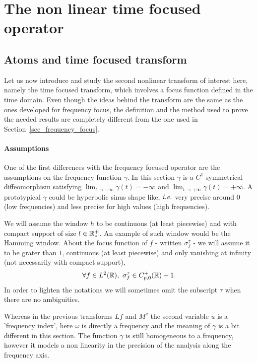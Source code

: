 \section{The non linear time focused operator}\label{sec_time_focus}

\subsection{Atoms and time focused transform}
\label{sse:definitions.timefocus}
Let us now introduce and study the second nonlinear transform of interest here, namely the time focused transform, which involves a focus function defined in the time domain. Even though the ideas behind the transform are the same as the ones developed for frequency focus, the definition and the method used to prove the needed results are completely different from the one used in Section~\ref{sec_frequency_focus}.


\paragraph{Assumptions}

One of the first differences with the frequency focused operator are the assumptions on the frequency function $\gamma$. In this section $\gamma$ is a $C^1$ symmetrical diffeomorphism satisfying $\lim_{t\to -\infty}\gamma(t)=-\infty$  and $\lim_{t\to +\infty}\gamma(t)=+\infty$. A prototypical $\gamma$ could be hyperbolic sinus shape like, $\textit{i.e.}$ very precise around $0$ (low frequencies) and less precise for high values (high frequencies).

We will assume the window $h$ to be continuous (at least piecewise) and with compact support of size $l\in\mathbb{R}^+_*$. An example of such window would be the Hamming window. About the focus function of $f$ - written $\sigma_f^\tau$ - we will assume it to be grater than $1$, continuous (at least piecewise) and only vanishing at infinity (not necessarily with compact support), \ie
\begin{equation}
    \forall f\in L^2(\mathbb{R}), \  \sigma^\tau_f \in C^+_{p,0}(\mathbb{R}) + 1.
\end{equation}
In order to lighten the notations we will sometimes omit the subscript $\tau$ when there are no ambiguities.
\begin{remark}
    Whereas in the previous transforms $Lf$ and $M^\nu$ the second variable $u$ is a 'frequency index', here $\omega$ is directly a frequency and the meaning of $\gamma$ is a bit different in this section. The function $\gamma$ is still homogeneous to a frequency, however it models a non linearity in the precision of the analysis along the frequency axis.
\end{remark}

